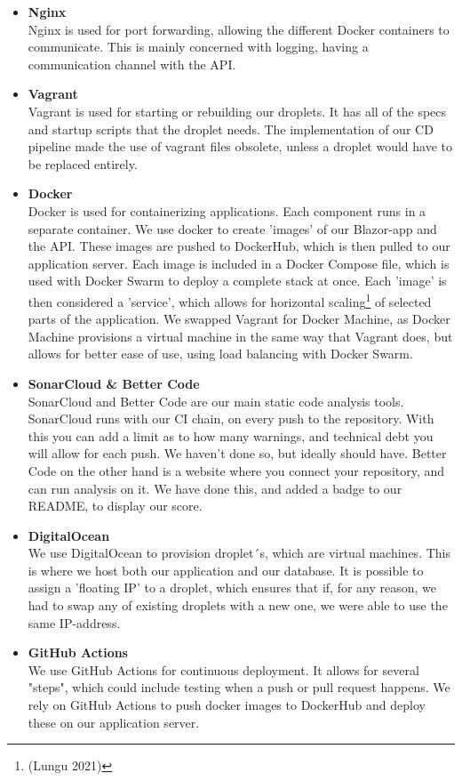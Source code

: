 \documentclass{article}
\begin{document}
\begin{itemize}
 	\item \textbf{Nginx\\}
 	Nginx is used for port forwarding, allowing the different Docker containers to communicate. This is mainly concerned with logging, having a communication channel with the API.
 	
 	\item \textbf{Vagrant}\\
 	Vagrant is used for starting or rebuilding our droplets. It has all of the specs and startup scripts that the droplet needs. The implementation of our CD pipeline made the use of vagrant files obsolete, unless a droplet would have to be replaced entirely.
 	
 	\item \textbf{Docker\\}
 	Docker is used for containerizing applications. Each component runs in a separate container. We use docker to create 'images' of our Blazor-app and the API. These images are pushed to DockerHub, which is then pulled to our application server. Each image is included in a Docker Compose file, which is used with Docker Swarm to deploy a complete stack at once. Each 'image' is then considered a 'service', which allows for horizontal scaling\footnote{(Lungu 2021)} of selected parts of the application. We swapped Vagrant for Docker Machine, as Docker Machine provisions a virtual machine in the same way that Vagrant does, but allows for better ease of use, using load balancing with Docker Swarm.
 	
 	\item \textbf{SonarCloud \& Better Code}\\
 	SonarCloud and Better Code are our main static code analysis tools. SonarCloud runs with our CI chain, on every push to the repository. With this you can add a limit as to how many warnings, and technical debt you will allow for each push. We haven't done so, but ideally should have. Better Code on the other hand is a website where you connect your repository, and can run analysis on it. We have done this, and added a badge to our README, to display our score.
 	\item \textbf{DigitalOcean}\\
 	We use DigitalOcean to provision droplet´s, which are virtual machines. This is where we host both our application and our database. It is possible to assign a 'floating IP' to a droplet, which ensures that if, for any reason, we had to swap any of existing droplets with a new one, we were able to use the same IP-address.
 	\item \textbf{GitHub Actions}\\
 	We use GitHub Actions for continuous deployment. It allows for several "steps", which could include testing when a push or pull request happens. We rely on GitHub Actions to push docker images to DockerHub and deploy these on our application server.
 	
\end{itemize}
\end{document}
